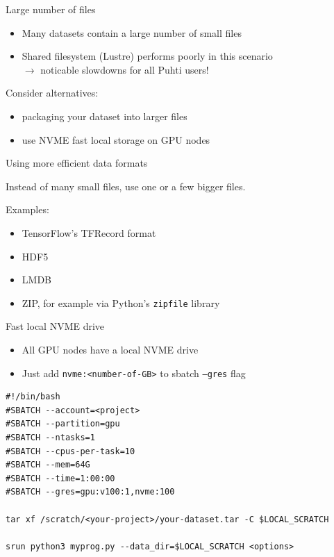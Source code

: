 \documentclass[aspectratio=1610,14pt]{beamer}
\newcommand{\vitem}{\vfill\item}
\begin{document}
\begin{frame}{Large number of files}
  \begin{itemize}
  \vitem Many datasets contain a large number of small files
  \vitem Shared filesystem (Lustre) performs poorly in this scenario \\
    $\rightarrow$ noticable slowdowns for all Puhti users!
  \end{itemize}

  \vfill
  Consider alternatives:

  \begin{itemize}
  \vitem packaging your dataset into larger files                     
  \vitem use NVME fast local storage on GPU nodes
  \end{itemize}
\end{frame}

\begin{frame}{Using more efficient data formats}

  Instead of many small files, use one or a few bigger files.

  \vfill
  
  Examples:

  \begin{itemize}
  \vitem TensorFlow's TFRecord format
  \vitem HDF5
  \vitem LMDB
  \vitem ZIP, for example via Python's {\tt zipfile} library
  \end{itemize}

  \vfill
\end{frame}

\begin{frame}[fragile]{Fast local NVME drive}

  \begin{itemize}
  \item All GPU nodes have a local NVME drive
  \item Just add {\tt nvme:<number-of-GB>} to sbatch {\tt --gres} flag
  \end{itemize}

\begin{verbatim}
#!/bin/bash
#SBATCH --account=<project>
#SBATCH --partition=gpu
#SBATCH --ntasks=1
#SBATCH --cpus-per-task=10
#SBATCH --mem=64G
#SBATCH --time=1:00:00
#SBATCH --gres=gpu:v100:1,nvme:100

tar xf /scratch/<your-project>/your-dataset.tar -C $LOCAL_SCRATCH

srun python3 myprog.py --data_dir=$LOCAL_SCRATCH <options>
\end{verbatim}

\end{frame}
\end{document}
